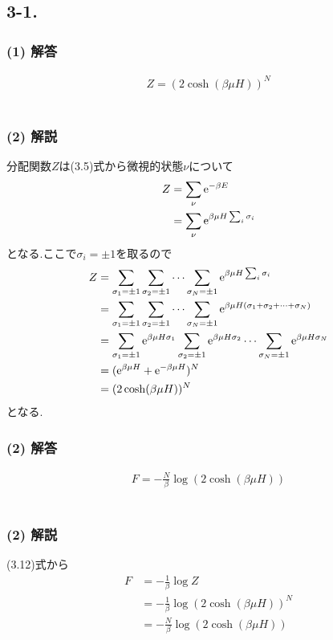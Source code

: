 \documentclass[uplatex,a4j,11pt,dvipdfmx]{jsarticle}
\begin{document}
\subsection*{3-1.}
\subsubsection*{(1) 解答}
\begin{align*}
  Z=\left(2\cosh (\beta\mu H)\right)^N
\end{align*}
\dotfill\\
\subsubsection*{(2) 解説}
分配関数$Z$は(3.5)式から微視的状態$\nu$について
\begin{align*}
  Z&=\sum_\nu{\rm e}^{-\beta E}\\
  &=\sum_\nu{\rm e}^{\beta\mu H\sum_i \sigma_i}
\end{align*}
となる.ここで$\sigma_i=\pm1$を取るので
\begin{align}
  Z&=\sum_{\sigma_1=\pm1}\sum_{\sigma_2=\pm1}\cdots\sum_{\sigma_N=\pm1}{\rm e}^{\beta\mu H\sum_i \sigma_i}\nonumber\\
  &=\sum_{\sigma_1=\pm1}\sum_{\sigma_2=\pm1}\cdots\sum_{\sigma_N=\pm1}{\rm e}^{\beta\mu H(\sigma_1+\sigma_2+\cdots+\sigma_N)}\\
  &=\sum_{\sigma_1=\pm1}{\rm e}^{\beta\mu H\sigma_1} \sum_{\sigma_2=\pm1}{\rm e}^{\beta\mu H\sigma_2}\cdots \sum_{\sigma_N=\pm1}{\rm e}^{\beta\mu H\sigma_N}\nonumber\\
  &=({\rm e}^{\beta\mu H}+{\rm e}^{-\beta\mu H})^N\nonumber\\
  &=(2\cosh (\beta\mu H))^N\nonumber
\end{align}
となる.
\clearpage
\subsubsection*{(2) 解答}
\begin{align*}
  F=-\frac{N}{\beta}\log(2\cosh (\beta\mu H))
\end{align*}
\dotfill\\
\subsubsection*{(2) 解説}
(3.12)式から
\begin{align}
  F&=-\frac{1}{\beta}\log Z\\
  &=-\frac{1}{\beta}\log (2\cosh (\beta\mu H))^N\nonumber\\
  &=-\frac{N}{\beta}\log(2\cosh (\beta\mu H))
\end{align}
\clearpage
\end{document}
